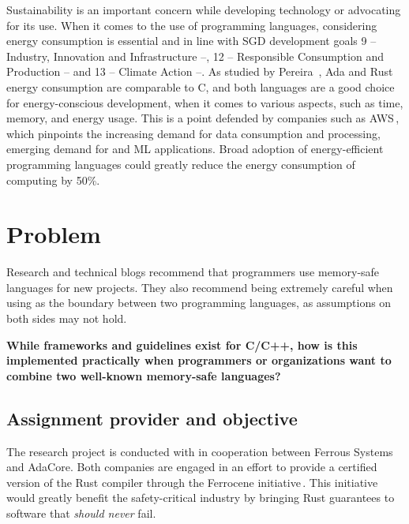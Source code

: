 \documentclass[nomenclature, english, bibtex]{kththesis}
\newcommand*{\sweExpl}[1]{\todo[inline, backgroundcolor=kth-lightblue40]{#1}}  %
\begin{document}
Sustainability is an important concern while developing technology or advocating for its use. When it comes to the use of programming languages, considering energy consumption is essential and in line with SGD development goals 9 -- Industry, Innovation and Infrastructure --, 12 -- Responsible Consumption and Production -- and 13 -- Climate Action --\cite{noauthor_envision2030_nodate}. As studied by Pereira \etal\,\cite{pereira_energy_2017}, Ada and Rust energy consumption are comparable to C, and both languages are a good choice for energy-conscious development, when it comes to various aspects, such as time, memory, and energy usage. This is a point defended by companies such as AWS\,\cite{miller_sustainability_2022}, which pinpoints the increasing demand for data consumption and processing, emerging demand for  and ML applications. Broad adoption of energy-efficient programming languages could greatly reduce the energy consumption of computing by 50\%\cite{miller_sustainability_2022}.

\section{Problem}
\label{sec:problem}

Research and technical blogs recommend that programmers use memory-safe languages for new projects. They also recommend being extremely careful when using  as the boundary between two programming languages, as assumptions on both sides may not hold. 

\textbf{While frameworks and guidelines exist for C/C++, how is this implemented practically when programmers or organizations want to combine two well-known memory-safe languages?}

\subsection{Assignment provider and objective}

The research project is conducted with in cooperation between Ferrous Systems and AdaCore. Both companies are engaged in an effort to provide a certified version of the Rust compiler through the Ferrocene initiative\,\cite{noauthor_ferrocene_2023}. This initiative would greatly benefit the \gls{safety-critical} industry by bringing Rust guarantees to software that \emph{should never} fail.
\end{document}
